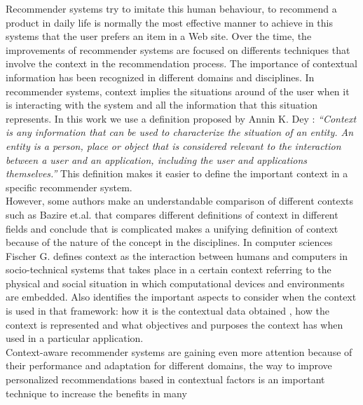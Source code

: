 Recommender systems try to imitate this human behaviour, to
recommend a product in daily life is normally the most effective
manner to achieve in this systems that the user prefers an item in a
Web site.
Over the time, the improvements of recommender systems are
focused on differents techniques that involve the context in the
recommendation process. 
The importance of contextual information has
been recognized in different domains and disciplines. %
In recommender
systems, context implies the situations around of the user when it is 
interacting with the system and all the information that this
situation represents. 
In this work we use a definition proposed by Annin K.
Dey \cite{dey2001understanding}: \textit{``Context is any information
that can be used to characterize the situation of an entity. An entity
is a person, place or object that is considered relevant to the
interaction between a user and an application, including the user and
applications themselves.''} 
This definition makes it easier to define
the important context in a specific recommender system.\\  %
However, some authors make an understandable comparison of different %
contexts such as Bazire et.al. \cite{bazire2005understanding} that compares 
different definitions of context in different fields and conclude that is
complicated makes a unifying definition of context because of the
nature of the concept in the disciplines. In computer sciences Fischer
G. \cite{fischer2012context} defines context as the interaction
between humans and computers in socio-technical systems that takes
place in a certain context referring to the physical and social
situation in which computational devices and environments are
embedded. %
Also identifies the important aspects to consider when the
context is used in that framework: how it is the contextual data obtained , how
the context is represented and what objectives and purposes the
context has when used in a particular application. \\
Context-aware recommender systems are gaining even more attention
because of their performance and adaptation for different domains, the %
way to improve personalized recommendations based in contextual 
factors is an important technique to increase the benefits in many
